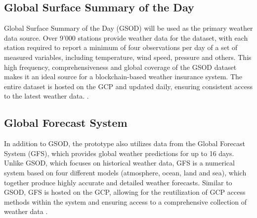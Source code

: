 \subsection{Global Surface Summary of the Day}\label{GSOD}
Global Surface Summary of the Day (GSOD) will be used as the primary weather data source. Over 9'000 stations provide weather data for the dataset, with each station required to report a minimum of four observations per day of a set of measured variables, including temperature, wind speed, pressure and others. This high frequency, comprehensiveness and global coverage of the GSOD dataset makes it an ideal source for a blockchain-based weather insurance system. The entire dataset is hosted on the GCP and updated daily, ensuring consistent access to the latest weather data. \autocite{NOAA_GSOD_2023}.

\subsection{Global Forecast System}\label{GFS}
In addition to GSOD, the prototype also utilizes data from the Global Forecast System (GFS), which provides global weather predictions for up to 16 days. Unlike GSOD, which focuses on historical weather data, GFS is a numerical system based on four different models (atmosphere, ocean, land and sea), which together produce highly accurate and detailed weather forecasts. Similar to GSOD, GFS is hosted on the GCP, allowing for the reutilization of GCP access methods within the system and ensuring access to a comprehensive collection of weather data \autocite{NOAA_GSOD_2020}.
